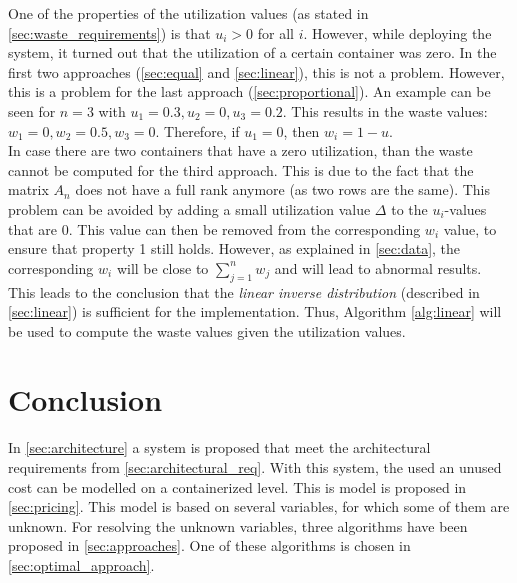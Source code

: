 \noindent
One of the properties of the utilization values (as stated in \autoref{sec:waste_requirements}) is that $u_i > 0$ for all $i$. However, while deploying the system, it turned out that the utilization of a certain container was zero. In the first two approaches (\autoref{sec:equal} and \autoref{sec:linear}), this is not a problem. However, this is a problem for the last approach (\autoref{sec:proportional}). An example can be seen for $n = 3$ with $u_1 = 0.3, u_2 = 0, u_3 = 0.2$. This results in the waste values: $w_1 = 0, w_2 = 0.5, w_3 = 0$. Therefore, if $u_1 = 0$, then $w_i = 1 - u$.\\

\noindent
In case there are two containers that have a zero utilization, than the waste cannot be computed for the third approach. This is due to the fact that the matrix $A_n$ does not have a full rank anymore (as two rows are the same). This problem can be avoided by adding a small utilization value $\Delta$ to the $u_i$-values that are $0$. This value can then be removed from the corresponding $w_i$ value, to ensure that property 1 still holds. However, as explained in \autoref{sec:data}, the corresponding $w_i$ will be close to $\sum_{j=1}^n w_j$ and will lead to abnormal results. This leads to the conclusion that the \textit{linear inverse distribution} (described in \autoref{sec:linear}) is sufficient for the implementation. Thus, Algorithm \ref{alg:linear} will be used to compute the waste values given the utilization values.

\section{Conclusion}
In \autoref{sec:architecture} a system is proposed that meet the architectural requirements from \autoref{sec:architectural_req}. With this system, the used an unused cost can be modelled on a containerized level. This is model is proposed in \autoref{sec:pricing}. This model is based on several variables, for which some of them are unknown. For resolving the unknown variables, three algorithms have been proposed in \autoref{sec:approaches}. One of these algorithms is chosen in \autoref{sec:optimal_approach}.